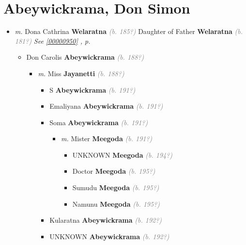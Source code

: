 \documentclass[10pt, openany]{book}
\begin{document}
\chapter{Abeywickrama, Don Simon}
\label{00000026}
\textcolor{slmaroon}{\textit{}}
\begin{itemize}
\item{\textit{m.} Dona Cathrina \textbf{Welaratna} \textcolor{gray}{\textit{(b. 185?)}} Daughter of  Father \textbf{Welaratna} \textcolor{gray}{\textit{(b. 181?)}} \textcolor{slteal}{\textit{See  \autoref{00000950} \textit{, p. \pageref{00000950} }}}   \label{couple:00000026:00000948} \begin{itemize}
\item{Don Carolis \textbf{Abeywickrama} \textcolor{gray}{\textit{(b. 188?)}}
\begin{itemize}
\item{\textit{m.} Miss \textbf{Jayanetti} \textcolor{gray}{\textit{(b. 188?)}}   \label{couple:00000022:00000267} \begin{itemize}
\item{S \textbf{Abeywickrama} \textcolor{gray}{\textit{(b. 191?)}}
 }
\item{Emaliyana \textbf{Abeywickrama} \textcolor{gray}{\textit{(b. 191?)}}
 }
\item{Soma \textbf{Abeywickrama} \textcolor{gray}{\textit{(b. 191?)}}
\begin{itemize}
\item{\textit{m.} Mister \textbf{Meegoda} \textcolor{gray}{\textit{(b. 191?)}}   \label{couple:00000051:00000537} \begin{itemize}
\item{UNKNOWN \textbf{Meegoda} \textcolor{gray}{\textit{(b. 194?)}}
 }
\item{Doctor \textbf{Meegoda} \textcolor{gray}{\textit{(b. 195?)}}
 }
\item{Sumudu \textbf{Meegoda} \textcolor{gray}{\textit{(b. 195?)}}
 }
\item{Namunu \textbf{Meegoda} \textcolor{gray}{\textit{(b. 195?)}}
 }
\end{itemize}}
\end{itemize}
 }
\item{Kularatna \textbf{Abeywickrama} \textcolor{gray}{\textit{(b. 192?)}}
 }
\item{UNKNOWN \textbf{Abeywickrama} \textcolor{gray}{\textit{(b. 192?)}}
}
\end{itemize}}
\end{itemize}}
\end{itemize}}
\end{itemize}
\end{document}
